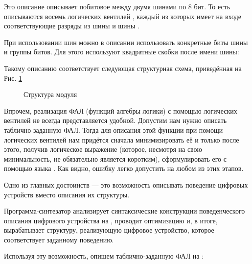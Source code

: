 

\par{Это описание описывает побитовое  между двумя шинами по 8 бит. То есть описываются восемь логических вентилей , каждый из которых имеет на входе соответствующие разряды из шины \emph{} и шины \emph{}.}

\par{При использовании шин можно в описании использовать конкретные биты шины и группы битов. Для этого используют квадратные скобки после имени шины:}



\par{Такому описанию соответствует следующая структурная схема, приведённая на Рис. \ref{fig:bitwiseops}}

\begin{figure}[H]
  \centering
  \def\svgwidth{\columnwidth}
  
  \caption{Структура модуля }
  \label{fig:bitwiseops}
\end{figure}

\par{Впрочем, реализация ФАЛ (функций алгебры логики) с помощью логических вентилей не всегда представляется удобной. Допустим нам нужно описать таблично-заданную ФАЛ. Тогда для описания этой функции при помощи логических вентилей нам придётся сначала минимизировать её и только после этого, получив логическое выражение (которое, несмотря на свою минимальность, не обязательно является коротким), сформулировать его с помощью языка . Как видно, ошибку легко допустить на любом из этих этапов.}

\par{Одно из главных достоинств  — это возможность описывать поведение цифровых устройств вместо описания их структуры.}

\par{Программа-синтезатор анализирует синтаксические конструкции поведенческого описания цифрового устройства на , проводит оптимизацию и, в итоге, вырабатывает структуру, реализующую цифровое устройство, которое соответствует заданному поведению.}

\par{Используя эту возможность, опишем таблично-заданную ФАЛ на :}

